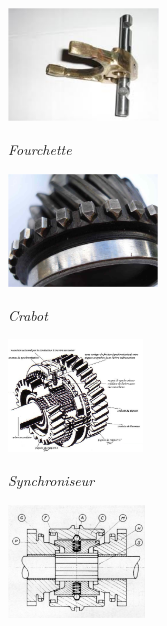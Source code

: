 \documentclass[11pt,oneside]{article}
\begin{document}
\begin{minipage}[c]{.2\linewidth}
\begin{center}
\includegraphics[height=3cm]{png/fig_88}

\textit{Fourchette}
\end{center}
\end{minipage} \hfill
\begin{minipage}[c]{.2\linewidth}
\begin{center}
\includegraphics[height=3cm]{png/fig_89}

\textit{Crabot}
\end{center}
\end{minipage} \hfill
\begin{minipage}[c]{.2\linewidth}
\begin{center}
\includegraphics[height=3cm]{png/fig_90}

\textit{Synchroniseur}
\end{center}
\end{minipage} \hfill
\begin{minipage}[c]{.2\linewidth}
\begin{center}
\includegraphics[height=3cm]{png/fig_91}
\end{center}
\end{minipage} 
\end{document}
